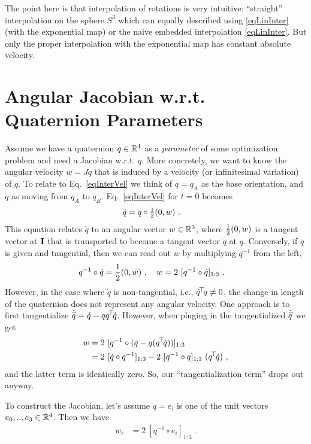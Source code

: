 The point here is that interpolation of rotations is very
intuitive: ``straight'' interpolation on the sphere $S^3$ which can
equally described using \eqref{eqLinInter} (with the exponential
map) or the naive embedded interpolation \eqref{eqLinInter}. But only the proper
interpolation with the exponential map has constant absolute velocity.

\section{Angular Jacobian w.r.t. Quaternion Parameters}

Assume we have a quaternion $q\in{\mathbb{R}}^4$ as a \emph{parameter} of some
optimization problem and need a Jacobian w.r.t. $q$. More concretely,
we want to know the angular
velocity $w = J \dot q$ that is induced by a velocity (or infinitesimal
variation) of $q$. To relate to Eq.~\eqref{eqInterVel} we think of
$q=q_A$ as the base orientation, and $\dot q$ as moving from $q_A$ to
$q_B$. Eq.~\eqref{eqInterVel} for $t=0$ becomes
\begin{align}
\dot q &= q \circ \textstyle\frac12 (0, w) ~.
\end{align}
This equation relates $\dot q$ to an angular vector $w\in{\mathbb{R}}^3$,
where $\textstyle\frac12 (0, w)$ is a tangent vector at ${\rm\bf I}$ that is
transported to become a tangent vector $\dot q$ at $q$.  Conversely,
if $\dot q$ is given and tangential, then we can read out $w$ by
multiplying $q^{-1}$ from the left,
\begin{align}
q^{-1} \circ \dot q 
&= \frac{1}{2} (0,w) ~,\quad w = 2~ [q^{-1} \circ \dot q]_{1:3} ~.
\end{align}
However, in the case where $\dot q$ is non-tangential, i.e., $\dot q^{\!\top\!} q \not=0$,
the change in length of the quaternion does not represent any angular
velocity. One approach is to first tangentialize
$\dot {\widehat q} = \dot q - q q^{\!\top\!} \dot q$.
However, when pluging in the tangentialized
$\dot{\widehat q}$ we get
\begin{align}
w
&= 2~ [q^{-1} \circ (\dot q - q (q^{\!\top\!} \dot q))]_{1:3} \\
&= 2~ [\dot q \circ q^{-1}]_{1:3} - 2~ [q^{-1} \circ q]_{1:3}~ (q^{\!\top\!} \dot q) ~,
\end{align}
and the latter term is identically zero. So, our ``tangentialization term'' drops out anyway.

To construct the Jacobian, let's assume $\dot q=e_i$ is one of the unit vectors
$e_0,..,e_3\in{\mathbb{R}}^4$. Then we have
\begin{align}
w_i
&= 2~ [q^{-1} \circ e_i]_{1:3} ~.
\end{align}

